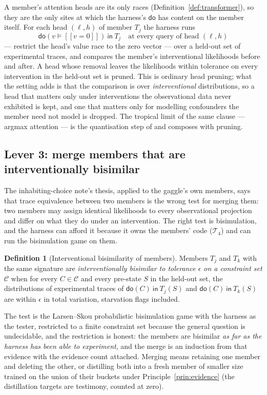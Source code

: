 \documentclass[11pt]{article}
\theoremstyle{plain}
\theoremstyle{definition}
\newtheorem{definition}[theorem]{Definition}
\theoremstyle{remark}
\newcommand{\crisp}[1]{[\![#1]\!]}
\newcommand{\dok}{\textsf{do}}
\newcommand{\ink}{\textsf{in}}
\begin{document}
A member's attention heads are its only races (Definition~\ref{def:transformer}),
so they are the only sites at which the harness's $\dok$ has content on the
member itself. For each head $(\ell, h)$ of member $T_j$ the harness runs
\[
\dok(v \models \crisp{v = 0})\ \ink\ T_j \quad\text{at every query of head } (\ell,h)
\]
--- restrict the head's value race to the zero vector --- over a held-out set of
experimental traces, and compares the member's interventional likelihoods
before and after. A head whose removal leaves the likelihoods within tolerance
on every intervention in the held-out set is pruned. This is ordinary head
pruning; what the setting adds is that the comparison is over
\emph{interventional} distributions, so a head that matters only under
interventions the observational data never exhibited is kept, and one that
matters only for modelling confounders the member need not model is dropped.
The tropical limit of the same clause --- argmax attention --- is the
quantisation step of \cite{TransformerProposal} and composes with pruning.

\subsection{Lever 3: merge members that are interventionally bisimilar}
\label{ssec:merge}

The inhabiting-choice note's thesis, applied to the gaggle's own members, says
that trace equivalence between two members is the wrong test for merging them:
two members may assign identical likelihoods to every observational projection
and differ on what they do under an intervention. The right test is
bisimulation, and the harness can afford it because it owns the members' code
($\mathcal{T}_4$) and can run the bisimulation game on them.

\begin{definition}[Interventional bisimilarity of members]
Members $T_j$ and $T_k$ with the same signature are \emph{interventionally
bisimilar to tolerance $\epsilon$ on a constraint set $\mathcal{C}$} when for
every $C \in \mathcal{C}$ and every pre-state $S$ in the held-out set, the
distributions of experimental traces of $\dok(C)\ \ink\ T_j(S)$ and
$\dok(C)\ \ink\ T_k(S)$ are within $\epsilon$ in total variation, starvation
flags included.
\end{definition}

The test is the Larsen--Skou probabilistic bisimulation game
\cite{LarsenSkou91} with the harness as the tester, restricted to a finite
constraint set because the general question is undecidable, and the restriction
is honest: the members are bisimilar \emph{as far as the harness has been able
to experiment}, and the merge is an induction from that evidence with the
evidence count attached. Merging means retaining one member and deleting the
other, or distilling both into a fresh member of smaller size trained on the
union of their buckets under Principle~\ref{prin:evidence} (the distillation
targets are testimony, counted at zero).
\end{document}
